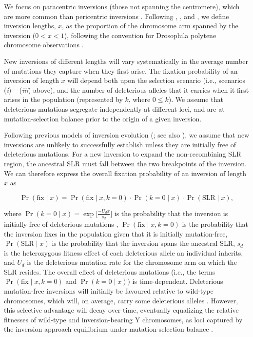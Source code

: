 \documentclass{article}[12pt]
\begin{document}
We focus on paracentric inversions (those not spanning the centromere), which are more common than pericentric inversions \citep{WellenreutherBernatchez2018}. Following \citet{vanValenLevins1968}, \citet{Santos1986}, and \citet{ConnallonOlito2020}, we define inversion lengths, $x$, as the proportion of the chromosome arm spanned by the inversion ($0 < x < 1$), following the convention for Drosophila polytene chromosome observations \cite[e.g.]{KrimbasPowell1992}.

New inversions of different lengths will vary systematically in the average number of mutations they capture when they first arise. The fixation probability of an inversion of length $x$ will depend both upon the selection scenario (i.e., scenarios ({\itshape i}) -- ({\itshape iii}) above), and the number of deleterious alleles that it carries when it first arises in the population (represented by $k$, where $0 \leq k$). We assume that deleterious mutations segregate independently at different loci, and are at mutation-selection balance prior to the origin of a given inversion. 

Following previous models of inversion evolution (\citealt{Nei1967, Santos1986, Connallon2018}; see also \citealt{OrrKim1998}), we assume that new inversions are unlikely to successfully establish unless they are initially free of deleterious mutations. For a new inversion to expand the non-recombining SLR region, the ancestral SLR must fall between the two breakpoints of the inversion. We can therefore express the overall fixation probability of an inversion of length $x$ as

\begin{equation}\label{eq:generalPrFix}
	\Pr(\text{fix} \mid x) = \Pr(\text{fix} \mid x, k=0) \cdot \Pr(k = 0 \mid x) \cdot \Pr(\text{SLR} \mid x),
\end{equation}

\noindent where $\Pr(k = 0 \mid x) = \exp \big[\frac{-U_d x}{s_d} \big]$ is the probability that the inversion is initially free of deleterious mutations \cite[e.g.][]{Nei1967,OrrKim1998}, $\Pr(\text{fix} \mid x, k=0)$ is the probability that the inversion fixes in the population given that it is initially mutation-free, $\Pr(\text{SLR} \mid x)$ is the probability that the inversion spans the ancestral SLR, $s_d$ is the heterozygous fitness effect of each deleterious allele an individual inherits, and $U_d$ is the deleterious mutation rate for the chromosome arm on which the SLR resides. The overall effect of deleterious mutations (i.e., the terms $\Pr(\text{fix} \mid x, k=0)$ and $\Pr(k = 0 \mid x)$) is time-dependent. Deleterious mutation-free inversions will initially be favoured relative to wild-type chromosomes, which will, on average, carry some deleterious alleles \citep{Nei1967,OhtaKojima1968, KimuraOhta1970}. However, this selective advantage will decay over time, eventually equalizing the relative fitnesses of wild-type and inversion-bearing Y chromosomes, as loci captured by the inversion approach equilibrium under mutation-selection balance \citep{Nei1967}. 
\end{document}
